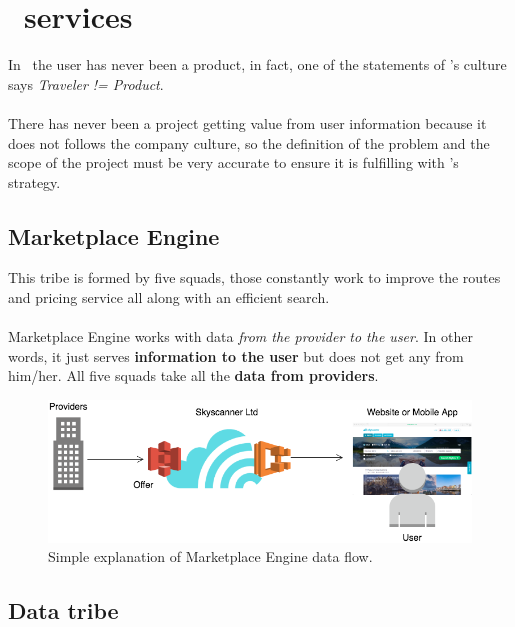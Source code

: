 
\section{\company\ services}

In \company\ the user has never been a product, in fact, one of the statements of \company's culture says \textit{Traveler != Product}\cite{the_road_ahead}.
\\\\
There has never been a project getting value from user information because it does not follows the company culture, so the definition of the problem and the scope of the project must be very accurate to ensure it is fulfilling with \company's strategy\cite{skyscanner_strategy}.

\subsection{Marketplace Engine} \label{mp_engine}

This tribe is formed by five squads, those constantly work to improve the routes and pricing service all along with an efficient search.
\\\\
Marketplace Engine works with data \textit{from the provider to the user}. In other words, it just serves \textbf{information to the user} but does not get any from him/her. All five squads take all the \textbf{data from providers}.

\begin{figure}[H]
\centering
\includegraphics[scale=0.45]{diagrams/state-of-the-art-tribes-marketplace-engine.png}
\caption{Simple explanation of Marketplace Engine data flow.}
\end{figure}

\subsection{Data tribe} \label{data_tribe}

